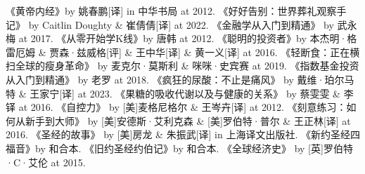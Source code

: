 \documentclass[12pt,oneside]{book}
\begin{document}
\begin{thebibliography}{99}
 《黄帝内经》by 姚春鹏[译] in 中华书局 at 2012.
 《好好告别：世界葬礼观察手记》 by Caitlin Doughty \& 崔倩倩[译] at 2022. 
 《金融学从入门到精通》 by 武永梅 at 2017.
 《从零开始学K线》by 唐韩 at 2012. 
 《聪明的投资者》by 本杰明·格雷厄姆 \& 贾森·兹威格[评] \& 王中华[译] \& 黄一义[译] at 2016.
  《轻断食：正在横扫全球的瘦身革命》 by 麦克尔·莫斯利 \& 咪咪·史宾赛 at 2019.
  《指数基金投资从入门到精通》 by 老罗 at 2018.
  《疯狂的尿酸：不止是痛风》 by 戴维·珀尔马特 \& 王家宁[译] at 2023.
  《果糖的吸收代谢以及与健康的关系》 by 蔡雯雯 \& 李铎 at 2016.
  《自控力》 by [美]麦格尼格尔  \& 王岑卉[译] at 2012.
 《刻意练习：如何从新手到大师》 by [美]安德斯·艾利克森 \& [美]罗伯特·普尔 \& 王正林[译] at 2016.
 《圣经的故事》 by [美]房龙 \& 朱振武[译] in 上海译文出版社.
 《新约圣经四福音》by 和合本.
 《旧约圣经约伯记》by 和合本.
 《全球经济史》 by [英]罗伯特·C·艾伦 at 2015.
\end{thebibliography}
\end{document}
